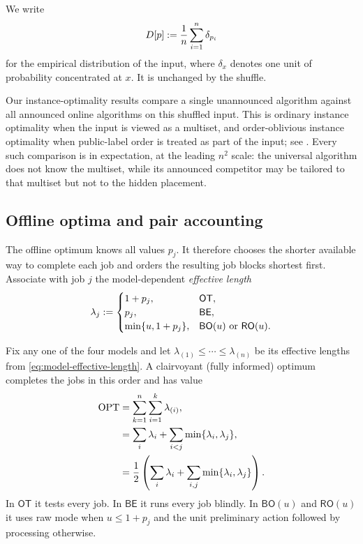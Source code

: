 We write
\begin{equation}
 D[p]\mathrel{:=}\frac1n\sum_{i=1}^n\delta_{p_i}
 \label{eq:empirical-distributions}
\end{equation}
for the empirical distribution of the input, where $\delta_x$ denotes one
unit of probability concentrated at $x$.  It is unchanged by the
shuffle.

Our instance-optimality results compare a single unannounced algorithm against
all announced online algorithms on this shuffled input.  This is ordinary
instance optimality when the input is viewed as a multiset, and order-oblivious
instance optimality when public-label order is treated as part of the input; see
\cite{AfshaniBarbayChan2017,NarayananRozhonTetekThorup2024}.
Every such comparison is in expectation, at the leading $n^2$ scale: the
universal algorithm does not know the multiset, while its announced
competitor may be tailored to that multiset but not to the hidden placement.

\subsection{Offline optima and pair accounting}

The offline optimum knows all values $p_j$.  It therefore chooses the shorter
available way to complete each job and orders the resulting job blocks
shortest first.  Associate with job $j$ the model-dependent
\emph{effective length}
\begin{equation}
 \lambda_j\mathrel{:=}
 \begin{cases}
  1+p_j, & \mathsf{OT},\\
  p_j, & \mathsf{BE},\\
  \min\{u,1+p_j\}, & \mathsf{BO}(u)\text{ or }\mathsf{RO}(u).
 \end{cases}
 \label{eq:model-effective-length}
\end{equation}

\begin{lemma}
\label{lem:offline}\label{lem:optional-offline}
Fix any one of the four models and let
$\lambda_{(1)}\le\cdots\le\lambda_{(n)}$ be its effective lengths from
\cref{eq:model-effective-length}.  A clairvoyant (fully informed) optimum
completes the jobs
in this order and has value
\begin{align}
 \operatorname{OPT}
 &=\sum_{k=1}^n\sum_{i=1}^k\lambda_{(i)},
 \label{eq:unified-opt-prefix}\\
 &=\sum_i\lambda_i+\sum_{i<j}\min\{\lambda_i,\lambda_j\},
 \label{eq:optional-opt-pair}\\
 &=\frac12\left(
      \sum_i\lambda_i+\sum_{i,j}\min\{\lambda_i,\lambda_j\}
    \right).
 \label{eq:unified-opt-symmetric}
\end{align}
In $\mathsf{OT}$ it tests every job.  In $\mathsf{BE}$ it runs every job
blindly.  In $\mathsf{BO}(u)$ and $\mathsf{RO}(u)$ it uses raw mode when
$u\le1+p_j$ and the unit preliminary action followed by processing otherwise.
\end{lemma}

